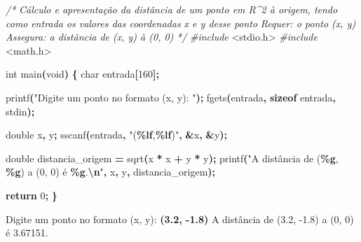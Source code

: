 \documentclass[
  11pt,
  a4paper,
]{scrbook}
\newenvironment{Shaded}{\begin{snugshade}}{\end{snugshade}}
\newcommand{\CommentTok}[1]{\textcolor[rgb]{0.56,0.35,0.01}{\textit{#1}}}
\newcommand{\ControlFlowTok}[1]{\textcolor[rgb]{0.13,0.29,0.53}{\textbf{#1}}}
\newcommand{\DataTypeTok}[1]{\textcolor[rgb]{0.13,0.29,0.53}{#1}}
\newcommand{\DecValTok}[1]{\textcolor[rgb]{0.00,0.00,0.81}{#1}}
\newcommand{\ImportTok}[1]{#1}
\newcommand{\KeywordTok}[1]{\textcolor[rgb]{0.13,0.29,0.53}{\textbf{#1}}}
\newcommand{\NormalTok}[1]{#1}
\newcommand{\OperatorTok}[1]{\textcolor[rgb]{0.81,0.36,0.00}{\textbf{#1}}}
\newcommand{\PreprocessorTok}[1]{\textcolor[rgb]{0.56,0.35,0.01}{\textit{#1}}}
\newcommand{\SpecialCharTok}[1]{\textcolor[rgb]{0.81,0.36,0.00}{\textbf{#1}}}
\newcommand{\StringTok}[1]{\textcolor[rgb]{0.31,0.60,0.02}{#1}}
\begin{document}
\begin{Shaded}
\begin{Highlighting}[]
\CommentTok{/*}
\CommentTok{Cálculo e apresentação da distância de um ponto em R\^{}2 à origem, tendo como}
\CommentTok{    entrada os valores das coordenadas x e y desse ponto}
\CommentTok{Requer: o ponto (x, y)}
\CommentTok{Assegura: a distância de (x, y) à (0, 0)}
\CommentTok{*/}
\PreprocessorTok{\#include }\ImportTok{\textless{}stdio.h\textgreater{}}
\PreprocessorTok{\#include }\ImportTok{\textless{}math.h\textgreater{}}

\DataTypeTok{int}\NormalTok{ main}\OperatorTok{(}\DataTypeTok{void}\OperatorTok{)} \OperatorTok{\{}
    \DataTypeTok{char}\NormalTok{ entrada}\OperatorTok{[}\DecValTok{160}\OperatorTok{];}

\NormalTok{    printf}\OperatorTok{(}\StringTok{"Digite um ponto no formato (x, y): "}\OperatorTok{);}
\NormalTok{    fgets}\OperatorTok{(}\NormalTok{entrada}\OperatorTok{,} \KeywordTok{sizeof}\NormalTok{ entrada}\OperatorTok{,}\NormalTok{ stdin}\OperatorTok{);}

    \DataTypeTok{double}\NormalTok{ x}\OperatorTok{,}\NormalTok{ y}\OperatorTok{;}
\NormalTok{    sscanf}\OperatorTok{(}\NormalTok{entrada}\OperatorTok{,} \StringTok{"(}\SpecialCharTok{\%lf}\StringTok{,}\SpecialCharTok{\%lf}\StringTok{)"}\OperatorTok{,} \OperatorTok{\&}\NormalTok{x}\OperatorTok{,} \OperatorTok{\&}\NormalTok{y}\OperatorTok{);}

    \DataTypeTok{double}\NormalTok{ distancia\_origem }\OperatorTok{=}\NormalTok{ sqrt}\OperatorTok{(}\NormalTok{x }\OperatorTok{*}\NormalTok{ x }\OperatorTok{+}\NormalTok{ y }\OperatorTok{*}\NormalTok{ y}\OperatorTok{);}
\NormalTok{    printf}\OperatorTok{(}\StringTok{"A distância de (}\SpecialCharTok{\%g}\StringTok{, }\SpecialCharTok{\%g}\StringTok{) a (0, 0) é }\SpecialCharTok{\%g}\StringTok{.}\SpecialCharTok{\textbackslash{}n}\StringTok{"}\OperatorTok{,}\NormalTok{ x}\OperatorTok{,}\NormalTok{ y}\OperatorTok{,}\NormalTok{ distancia\_origem}\OperatorTok{);}

    \ControlFlowTok{return} \DecValTok{0}\OperatorTok{;}
\OperatorTok{\}}
\end{Highlighting}
\end{Shaded}

\begin{Shaded}
\begin{Highlighting}[]
\NormalTok{Digite um ponto no formato (x, y): }\KeywordTok{ (3.2, {-}1.8) }
\NormalTok{A distância de (3.2, {-}1.8) a (0, 0) é 3.67151.}
\end{Highlighting}
\end{Shaded}
\end{document}
